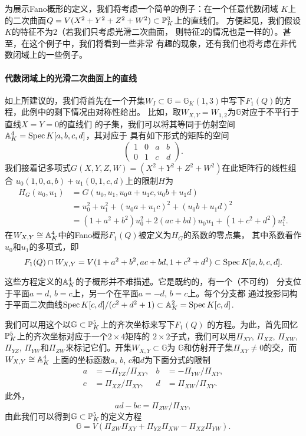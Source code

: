 为展示Fano概形的定义，我们将考虑一个简单的例子：在一个任意代数闭域
$K$上的二次曲面$Q=V(X^2+Y^2+Z^2+W^2)\subset \P_K^3$上的直线们。
方便起见，我们假设$K$的特征不为$2$（若我们只考虑光滑二次曲面，
则特征$2$的情况也是一样的）。甚至，在这个例子中，我们将看到一些非常
有趣的现象，还有我们也将考虑在非代数闭域上的一些例子。

\paragraph*{代数闭域上的光滑二次曲面上的直线}
如上所建议的，我们将首先在一个开集$W_I\subset \mathbb G=
\mathbb G_K(1,3)$中写下$F_1(Q)$的方程，此例中的剩下情况由对称性给出。
比如，取$W_{X,Y}=W_{1,2}$为$\mathbb G$对应于不平行于直线$X=Y=0$的直线们
的子集，我们可以将其等同于仿射空间$\A_K^4=\spec K[a,b,c,d]$，其对应于
具有如下形式的矩阵的空间
\begin{equation}
	\begin{pmatrix}
		1&0&a&b\\
		0&1&c&d
	\end{pmatrix}.
\end{equation}
我们接着记多项式$G(X,Y,Z,W)=(X^2+Y^2+Z^2+W^2)$在此矩阵行的线性组合
$u_0(1,0,a,b)+u_1(0,1,c,d)$上的限制$H$为
\[
	\begin{aligned}
		H_G(u_0,u_1)&=G(u_0,u_1,u_0a+u_1c,u_0b+u_1d)\\
		&=u_0^2+u_1^2+(u_0a+u_1c)^2+(u_0b+u_1d)^2\\
		&=(1+a^2+b^2)u_0^2+2(ac+bd)u_0u_1+(1+c^2+d^2)u_1^2.
	\end{aligned}
\]
在$W_{X,Y}\cong \A_K^4$中的Fano概形$F_1(Q)$被定义为$H_G$的系数的零点集，
其中系数看作$u_0$和$u_1$的多项式，即
\[
	F_1(Q)\cap W_{X,Y}=V(1+a^2+b^2,ac+bd,1+c^2+d^2)\subset \spec K[a,b,c,d].
\]


这些方程定义的$\A_K^4$的子概形并不难描述。它是既约的，有一个（不可约）
分支位于平面$a=d$, $b=c$上，另一个在平面$a=-d$, $b=c$上。每个分支都
通过投影同构于平面二次曲线$\spec K[c,d]/(c^2+d^2+1)\subset \A_K^2
=\spec K[c,d]$.

我们可以用这个以$\mathbb G\subset \P_K^5$上的齐次坐标来写下$F_1(Q)$
的方程。为此，首先回忆$\P_K^5$上的齐次坐标对应于一个$2\times 4$矩阵的
$2\times 2$子式，我们可以用$\Pi_{XY}$, $\Pi_{XZ}$, $\Pi_{XW}$, $\Pi_{YZ}$,
$\Pi_{YW}$和$\Pi_{ZW}$来标记它们。开集$W_{X,Y}\subset \mathbb G$为
$\mathbb G$和仿射开子集$\Pi_{XY}\neq 0$的交，而$W_{X,Y}\cong \A_K^4$
上面的坐标函数$a$, $b$, $c$和$d$为下面分式的限制
\[
	\begin{aligned}
		a&=-\Pi_{YZ}/\Pi_{XY},&b&=-\Pi_{YW}/\Pi_{XY},\\
		c&=\Pi_{XZ}/\Pi_{XY},&d&=\Pi_{XW}/\Pi_{XY}.
	\end{aligned}
\]
此外，
\[
	ad-bc=\Pi_{ZW}/\Pi_{XY},
\]
由此我们可以得到$\mathbb G\subset \P_K^5$的定义方程
\[
	\mathbb G=V(\Pi_{ZW}\Pi_{XY}+\Pi_{YZ}\Pi_{XW}-\Pi_{XZ}\Pi_{YW}).
\]

